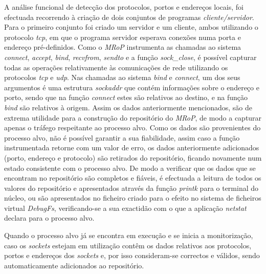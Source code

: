A análise funcional de detecção dos protocolos, portos e endereços locais, foi efectuada recorrendo à criação de dois conjuntos de programas \textit{cliente/servidor}.
Para o primeiro conjunto foi criado um servidor e um cliente, ambos utilizando o protocolo \textit{tcp}, em que o programa servidor esperava conexões numa porta e endereço pré-definidos.
Como o \textit{MRoP} instrumenta as chamadas ao sistema \textit{connect}, \textit{accept}, \textit{bind}, \textit{recvfrom}, \textit{sendto} e a função \textit{sock\_close}, é possível capturar todas as operações relativamente às comunicações de rede utilizando os protocolos \textit{tcp} e \textit{udp}.
Nas chamadas ao sistema \textit{bind} e \textit{connect}, um dos seus argumentos é uma estrutura \textit{sockaddr} que contém informações sobre o endereço e porto, sendo que na função \textit{connect} estes são relativos ao destino, e na função \textit{bind} são relativos à origem.
Assim os dados anteriormente mencionados, são de extrema utilidade para a construção do repositório do \textit{MRoP}, de modo a capturar apenas o tráfego respeitante ao processo alvo.
Como os dados são provenientes do processo alvo, não é possível garantir a sua fiabilidade, assim caso a função instrumentada retorne com um valor de erro, os dados anteriormente adicionados (porto, endereço e protocolo) são retirados do repositório, ficando novamente num estado consistente com o processo alvo.
De modo a verificar que os dados que se encontram no repositório são completos e fiáveis, é efectuada a leitura de todos os valores do repositório e apresentados através da função \textit{printk} para o terminal do núcleo, ou são apresentados no ficheiro criado para o efeito no sistema de ficheiros virtual \textit{DebugFs}, verificando-se a sua exactidão com o que a aplicação \textit{netstat} declara para o processo alvo.

Quando o processo alvo já se encontra em execução e se inicia a monitorização, caso os \textit{sockets} estejam em utilização contêm os dados relativos aos protocolos, portos e endereços dos \textit{sockets} e, por isso consideram-se correctos e válidos, sendo automaticamente adicionados ao repositório.



